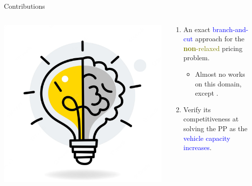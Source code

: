\begin{frame}{Contributions}
	\begin{columns}
		\begin{column}{0.3\textwidth}
			\centering
			\includegraphics[width=\textwidth]{./Imgs/idea.png}
		\end{column}
		\begin{column}{0.7\textwidth}
			\begin{enumerate}
				\item An exact \textcolor{blue}{branch-and-cut} approach for the \textcolor{olive}{\textbf{non}-relaxed} pricing problem.
				      \begin{itemize}
					      \item Almost no works on this domain, except \parencite{jepsen2014}.
				      \end{itemize}
				\item Verify its competitiveness at solving the PP as the \textcolor{blue}{vehicle capacity increases}.
			\end{enumerate}
		\end{column}
	\end{columns}
\end{frame}

